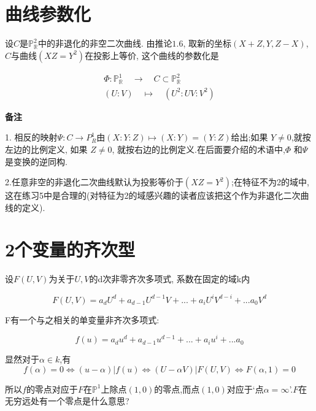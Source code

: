 \documentclass[UTF8]{book}
\begin{document}
	\section{曲线参数化}
		设$ C $是$\mathbb{P}^{2}_{\mathbb{R}}$中的非退化的非空二次曲线. 由推论$ 1.6 $, 取新的坐标$ (X+Z, Y, Z-X) $, $ C $与曲线$(XZ=Y^{2})$在投影上等价, 这个曲线的参数化是
	
		\begin{equation*}
		\begin{array}{l}{\Phi : \mathbb{P}^1_{\mathbb{R}}\quad \longrightarrow \quad C \subset \mathbb{P}^{2}_{\mathbb{R}}} \\ {(U : V) \quad\longmapsto\quad  \left(U^{2} : UV : V^{2}\right)}\end{array}
		\end{equation*}

		\textbf{备注}
		
		
	 	1. 相反的映射$\Psi: C\longrightarrow P^{1}_{R}$由$(X:Y:Z)\longmapsto(X:Y)=(Y:Z)$给出;如果 $Y \neq 0$,就按左边的比例定义, 如果 $Z \neq 0$, 就按右边的比例定义.在后面要介绍的术语中,$\Phi$ 和$\Psi$ 是变换的逆同构.
	
	
		2.任意非空的非退化二次曲线默认为投影等价于$(XZ=Y^{2})$;在特征不为2的域中,这在练习5中是合理的(对特征为2的域感兴趣的读者应该把这个作为非退化二次曲线的定义).
	\section{2个变量的齐次型}
		设$ F(U, V) $为关于$ U, V $的d次非零齐次多项式, 系数在固定的域k内
		
		\begin{equation*}
		F(U,V)=a_{d}U^{d}+a_{d-1}U^{d-1}V+...+a_{i}U^{i}V^{d-i}+...a_{0}V^{d}
		\end{equation*}
		
		F有一个与之相关的单变量非齐次多项式:
		
		\begin{equation*}
			f(u)=a_{d}u^{d}+a_{d-1}u^{d-1}+...+a_{i}u^{i}+...a_{0}
		\end{equation*}
		
		显然对于$ \alpha \in k $,有
		\begin{equation*}
		f(\alpha )=0 \Leftrightarrow (u-\alpha)|f(u)\Leftrightarrow (U-\alpha V)|F(U,V)\Leftrightarrow F(\alpha,1)=0
		\end{equation*}
		
		所以$ f $的零点对应于$ F $在$\mathbb{P}^{1}$上除点$ (1,0) $的零点,而点$ (1,0) $对应于‘点$\alpha =\infty$’.$ F $在无穷远处有一个零点是什么意思?
		
\end{document}
